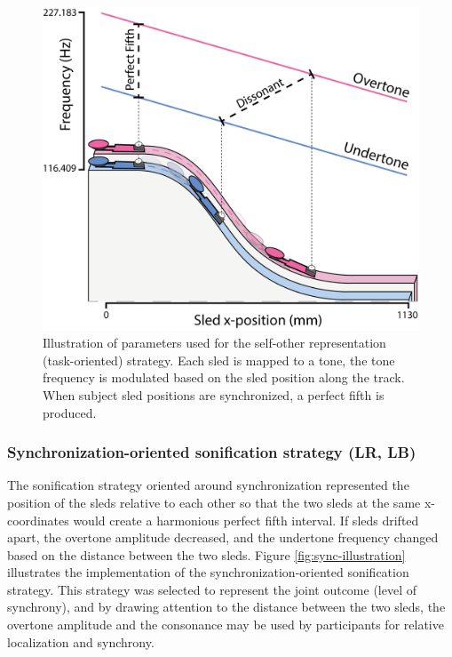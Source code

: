 \documentclass[10pt,a4paper,onecolumn]{article}
\begin{document}
\begin{figure}[h]

{\centering \includegraphics[width=1\linewidth]{figures/task_sonif_illustration} 

}

\caption{Illustration of parameters used for the self-other representation (task-oriented) strategy. Each sled is mapped to a tone, the tone frequency is modulated based on the sled position along the track. When subject sled positions are synchronized, a perfect fifth is produced.}\label{fig:task-illustration}
\end{figure}

\hypertarget{synchronization-oriented-sonification-strategy-lr-lb}{%
\subsubsection{Synchronization-oriented sonification strategy (LR, LB)}\label{synchronization-oriented-sonification-strategy-lr-lb}}

The sonification strategy oriented around synchronization represented the position of the sleds relative to each other so that the two sleds at the same x-coordinates would create a harmonious perfect fifth interval. If sleds drifted apart, the overtone amplitude decreased, and the undertone frequency changed based on the distance between the two sleds. Figure \ref{fig:sync-illustration} illustrates the implementation of the synchronization-oriented sonification strategy. This strategy was selected to represent the joint outcome (level of synchrony), and by drawing attention to the distance between the two sleds, the overtone amplitude and the consonance may be used by participants for relative localization and synchrony.
\end{document}
